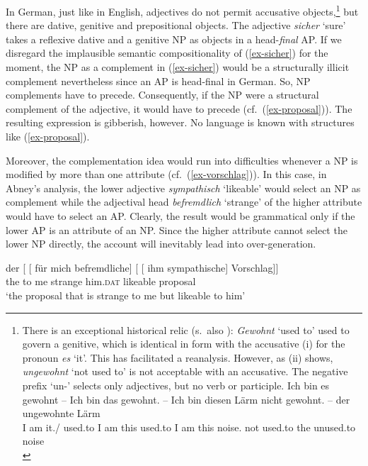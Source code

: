 \documentclass[output=paper
  ,nobabel
  ,uniformtopskip %
]{langscibook}
\begin{document}
In German, just like in English, adjectives do not permit accusative objects,\footnote{There is an
  exceptional historical relic (s.\ also \citealt[272]{Mueller99a}): \emph{Gewohnt} `used to' used to govern a genitive, which is identical in form with the accusative (i) for the pronoun \emph{es} `it'. This has facilitated a reanalysis. However, as (ii) shows, \emph{ungewohnt} `not used to' is not acceptable with an accusative. The negative prefix  `un-' selects only adjectives, but no verb or participle.
\ea
\gll Ich bin es             gewohnt – Ich bin das gewohnt. –  Ich bin diesen Lärm         nicht gewohnt. – der ungewohnte Lärm \\
     I   am  it.\GEN/\ACC{} used.to  {} I am this used.to  {} I   am  this   noise.\ACC{} not   used.to  {} the unused.to noise\\
\z
{}
\zlast
} but there are dative, genitive and prepositional objects. The adjective \emph{sicher} `sure' takes a reflexive dative and a genitive NP as objects in a head-\emph{final} AP. If we disregard the implausible semantic compositionality of (\ref{ex-sicher}) for the moment, the NP as a complement in (\ref{ex-sicher}) would be a structurally illicit complement nevertheless since an AP is head-final in German. So, NP complements have to precede. Consequently, if the NP were a structural complement of the adjective, it would have to precede (cf.\ (\ref{ex-proposal})). The resulting expression is gibberish, however. No language is known with structures like (\ref{ex-proposal}).

Moreover, the complementation idea would run into difficulties whenever a NP is modified by more than one attribute (cf.\ (\ref{ex-vorschlag})). In this case, in Abney's analysis, the lower adjective \emph{sympathisch} `likeable' would select an NP as complement while the adjectival head \emph{befremdlich} `strange' of the higher attribute would have to select an AP. Clearly, the result would be grammatical only if the lower AP is an attribute of an NP. Since the higher attribute cannot select the lower NP directly, the account will inevitably lead into over-generation.

\ea\label{ex-vorschlag}
\gll  der [ [ für mich befremdliche] [ [ ihm              sympathische] Vorschlag]]\\
      the {}        {}        to  me   strange       {}        {}        him\textsc{.dat} likeable      proposal\\
\glt `the proposal that is strange to me but likeable to him'
\z
\end{document}
